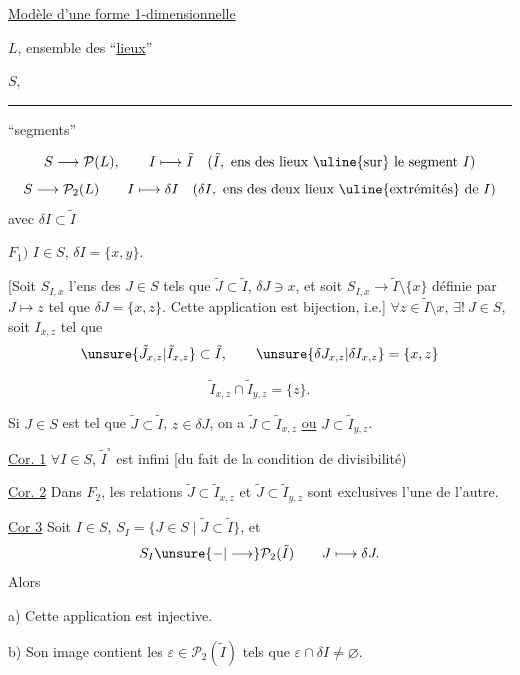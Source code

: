 \uline{Modèle d'une forme 1-dimensionnelle}

$L$, ensemble des ``\uline{lieux}''

$S$, \rule{3cm}{0.4pt} ``segments''

\[
S\longrightarrow\mathcal P(L),\qquad I\longmapsto\tilde I
\quad(\tilde I,\text{ ens des lieux \uline{sur} le segment }I)
\]
\[
S\longrightarrow\mathcal P_2(L)\qquad I\longmapsto\delta I
\quad(\delta I,\text{ ens des deux lieux \uline{extrémités} de }I)
\]
avec $\delta I\subset\tilde I$

$F_1)$  $I\in S$, $\delta I=\{x,y\}$. 

[Soit $S_{I,x}$ l'ens des $J\in S$ tels que $\tilde J\subset\tilde I$, $\delta J\ni x$, et soit
$S_{I,x}\longrightarrow\tilde I\setminus\{x\}$ définie par
$J\longmapsto z$ tel que $\delta J=\{x,z\}$. Cette application est bijection, i.e.]
$\forall z\in\tilde I\setminus x$, $\exists!\ J\in S$,  soit $I_{x,z}$ tel que
\[
\unsure{\tilde J_{x,z}|\tilde I_{x,z}}\subset\tilde I,\qquad
\unsure{\delta J_{x,z}|\delta I_{x,z}}=\{x,z\}
\]

\[
\tilde I_{x,z}\cap\tilde I_{y,z}=\{z\}.
\]

Si $J\in S$ est tel que $\tilde J\subset\tilde I$, $z\in\delta J$,
on a $\tilde J\subset\tilde I_{x,z}$ \uline{ou} $J\subset\tilde I_{y,z}$.

\uline{Cor. 1} \deleted{$\unsure{\forall}$} $\forall I\in S$, $\tilde I^\circ$ est infini [du fait de la condition de divisibilité)

\uline{Cor. 2} Dans $F_2$, les relations $\tilde J\subset\tilde I_{x,z}$ et $\tilde J\subset\tilde I_{y,z}$ sont exclusives l'une de l'autre.

\uline{Cor 3} Soit $I\in S$, \deleted{$\unsure{\exists}$} $S_I=\{J\in S\mid\tilde J\subset\tilde I\}$, et
\[
S_I\unsure{-|\longrightarrow}\mathcal P_2(\tilde I)\qquad J\longmapsto\delta J.
\]
Alors 

a) Cette application est injective.

b) Son image contient les $\varepsilon\in\mathcal P_2(\tilde I)$ tels que $\varepsilon\cap\delta I\neq\varnothing$.

